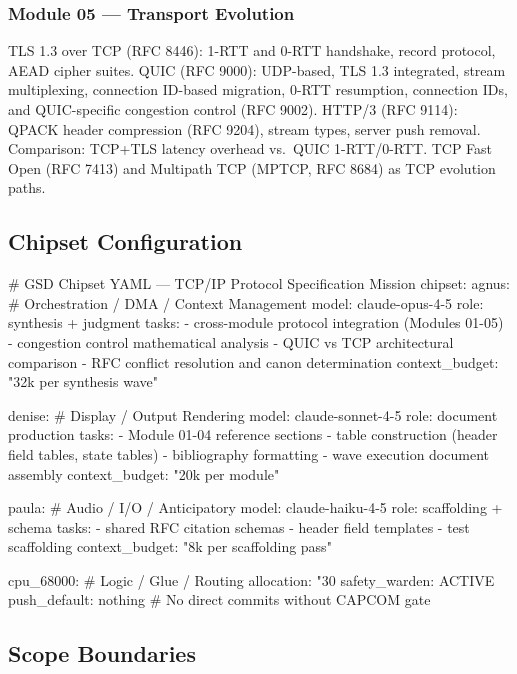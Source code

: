 \documentclass[11pt,letterpaper]{article}
\begin{document}
\subsubsection{Module 05 --- Transport Evolution}
TLS 1.3 over TCP (RFC 8446): 1-RTT and 0-RTT handshake, record protocol, AEAD cipher suites. QUIC (RFC 9000): UDP-based, TLS 1.3 integrated, stream multiplexing, connection ID-based migration, 0-RTT resumption, connection IDs, and QUIC-specific congestion control (RFC 9002). HTTP/3 (RFC 9114): QPACK header compression (RFC 9204), stream types, server push removal. Comparison: TCP+TLS latency overhead vs.\ QUIC 1-RTT/0-RTT. TCP Fast Open (RFC 7413) and Multipath TCP (MPTCP, RFC 8684) as TCP evolution paths.

\subsection{Chipset Configuration}

\begin{asciibox}
# GSD Chipset YAML — TCP/IP Protocol Specification Mission
chipset:
  agnus:                          # Orchestration / DMA / Context Management
    model: claude-opus-4-5
    role: synthesis + judgment
    tasks:
      - cross-module protocol integration (Modules 01-05)
      - congestion control mathematical analysis
      - QUIC vs TCP architectural comparison
      - RFC conflict resolution and canon determination
    context_budget: "32k per synthesis wave"

  denise:                         # Display / Output Rendering
    model: claude-sonnet-4-5
    role: document production
    tasks:
      - Module 01-04 reference sections
      - table construction (header field tables, state tables)
      - bibliography formatting
      - wave execution document assembly
    context_budget: "20k per module"

  paula:                          # Audio / I/O / Anticipatory
    model: claude-haiku-4-5
    role: scaffolding + schema
    tasks:
      - shared RFC citation schemas
      - header field templates
      - test scaffolding
    context_budget: "8k per scaffolding pass"

  cpu_68000:                      # Logic / Glue / Routing
    allocation: "30%
    safety_warden: ACTIVE
    push_default: nothing         # No direct commits without CAPCOM gate
\end{asciibox}

\subsection{Scope Boundaries}
\end{document}
